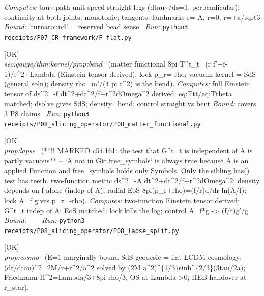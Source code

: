 \begin{description}
\emph{Computes:} tau\textasciitilde{}-path unit-speed straight legs (\textbar{}dtau\textasciitilde{}/ds\textbar{}=1, perpendicular); continuity at both joints; monotonic; tangents; landmarks r=-A, r=0, r=+a/sqrt3
 \emph{Bound:} 'turnaround' = reserved bead sense
\ \emph{Run:} \texttt{python3 receipts/P07\_CR\_framework/F\_flat.py}
\item[\label{rcpt:P08_matter_functional}\texttt{P08\_matter\_functional}]\hfill\textsf{[OK]}\\
\textit{sec:gauge/thm:kernel/prop:bend} \ (matter functional 8pi T\textasciicircum{}t\_t=(r f'+f-1)/r\textasciicircum{}2+Lambda (Einstein tensor derived); lock p\_r=-rho; vacuum kernel = SdS (general soln); density rho=m'/(4 pi r\textasciicircum{}2) is the bend). 
\emph{Computes:} full Einstein tensor of ds\textasciicircum{}2=-f dt\textasciicircum{}2+dr\textasciicircum{}2/f+r\textasciicircum{}2dOmega\textasciicircum{}2 derived; eq:Ttt/eq:Ttheta matched; dsolve gives SdS; density=bend; control straight vs bent
 \emph{Bound:} covers 3 P8 claims
\ \emph{Run:} \texttt{python3 receipts/P08\_slicing\_operator/P08\_matter\_functional.py}
\item[\label{rcpt:P08_lapse_split}\texttt{P08\_lapse\_split}]\hfill\textsf{[OK]}\\
\textit{prop:lapse} \ (**!! MARKED c54.161: the test that G\textasciicircum{}t\_t is independent of A is partly vacuous** -- `A not in Gtt.free\_symbols` is always true because A is an applied Function and free\_symbols holds only Symbols. Only the sibling has() test has teeth. two-function metric ds\textasciicircum{}2=-A dt\textasciicircum{}2+dr\textasciicircum{}2/f+r\textasciicircum{}2dOmega\textasciicircum{}2: density depends on f alone (indep of A); radial EoS 8pi(p\_r+rho)=(f/r)d/dr ln(A/f); lock A=f gives p\_r=-rho). 
\emph{Computes:} two-function Einstein tensor derived; G\textasciicircum{}t\_t indep of A; EoS matched; lock kills the log; control A=f*g -> (f/r)g'/g
 \emph{Bound:} ---
\ \emph{Run:} \texttt{python3 receipts/P08\_slicing\_operator/P08\_lapse\_split.py}
\item[\label{rcpt:P08_E1_cosmology}\texttt{P08\_E1\_cosmology}]\hfill\textsf{[OK]}\\
\textit{prop:cosmo} \ (E=1 marginally-bound SdS geodesic = flat-LCDM cosmology: (dr/dtau)\textasciicircum{}2=2M/r+r\textasciicircum{}2/a\textasciicircum{}2 solved by (2M a\textasciicircum{}2)\textasciicircum{}\{1/3\}sinh\textasciicircum{}\{2/3\}(3tau/2a); Friedmann H\textasciicircum{}2=Lambda/3+8pi rho/3; OS at Lambda->0; HEB handover at r\_star). 

\end{description}
